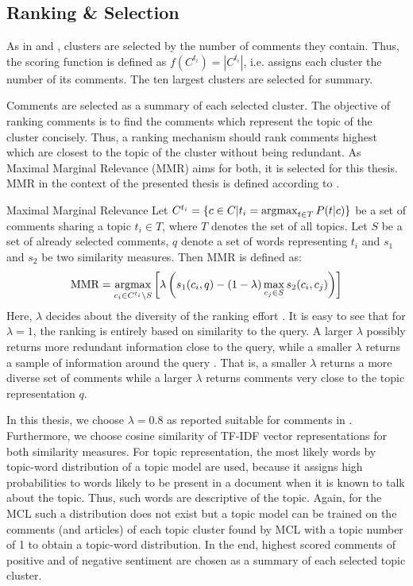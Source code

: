 \label{sumgen}
\subsection{Ranking \& Selection}
\label{ranking}
As in \cite{DBLP:conf/cikm/MaSYC12} and \cite{DBLP:conf/ecir/AkerKBPBHG16}, clusters are selected by the number of comments they contain. Thus, the scoring function is defined as $f(C^{t_i}) = |C^{t_i}|$, i.e. assigns each cluster the number of its comments. The ten largest clusters are selected for summary.\par
Comments are selected as a summary of each selected cluster.
The objective of ranking comments is to find the comments which represent the topic of the cluster concisely. Thus, a ranking mechanism should rank comments highest which are closest to the topic of the cluster without being redundant. As Maximal Marginal Relevance (MMR) \cite{Carbonell:1998:UMD:290941.291025} aims for both, it is selected for this thesis.
MMR in the context of the presented thesis is defined according to \cite{Carbonell:1998:UMD:290941.291025}.
\begin{definition}{Maximal Marginal Relevance}
Let $C^{t_i} = \{c \in C|t_i = \operatorname*{argmax}_{t \in T} P(t|c)\}$ be a set of comments sharing a topic $t_i \in T$, where $T$ denotes the set of all topics. Let $S$ be a set of already selected comments, $q$ denote a set of words representing $t_i$ and $s_1$ and $s_2$ be two similarity measures. Then MMR is defined as:
\begin{equation}
\text{MMR} = \operatorname*{argmax}_{c_i \in C^{t_i} \setminus S} \left[\lambda\left(s_1(c_i,q)-(1-\lambda)\max_{c_j \in S} s_2(c_i,c_j)\right)\right]
\end{equation}
Here, $\lambda$ decides about the diversity of the ranking effort \cite{Carbonell:1998:UMD:290941.291025}.
It is easy to see that for $\lambda = 1$, the ranking is entirely based on similarity to the query. A larger $\lambda$ possibly returns more redundant information close to the query, while a smaller $\lambda$ returns a sample of information around the query \cite{Carbonell:1998:UMD:290941.291025}. That is, a smaller $\lambda$ returns a more diverse set of comments while a larger $\lambda$ returns comments very close to the topic representation $q$.
\end{definition}
In this thesis, we choose $\lambda = 0.8$ as reported suitable for comments in \cite{DBLP:conf/cikm/MaSYC12}.
Furthermore, we choose cosine similarity of TF-IDF vector representations for both similarity measures.
For topic representation, the most likely words by topic-word distribution of a topic model are used, because it assigns high probabilities to words likely to be present in a document when it is known to talk about the topic. Thus, such words are descriptive of the topic. Again, for the MCL such a distribution does not exist but a topic model can be trained on the comments (and articles) of each topic cluster found by MCL with a topic number of 1 to obtain a topic-word distribution. In the end, highest scored comments of positive and of negative sentiment are chosen as a summary of each selected topic cluster.

